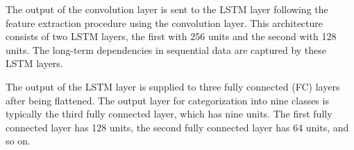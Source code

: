 The output of the convolution layer is sent to the LSTM layer following the feature extraction procedure using the convolution layer. This architecture consists of two LSTM layers, the first with 256 units and the second with 128 units. The long-term dependencies in sequential data are captured by these LSTM layers.

The output of the LSTM layer is supplied to three fully connected (FC) layers after being flattened. The output layer for categorization into nine classes is typically the third fully connected layer, which has nine units. The first fully connected layer has 128 units, the second fully connected layer has 64 units, and so on.
















